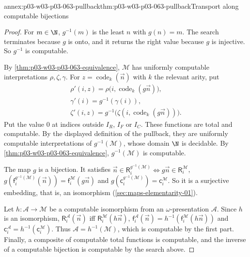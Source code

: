 \begin{annexitem}{annex:p03-w03-p03-063-pullback}{thm:p03-w03-p03-063-pullback}{Transport along computable bijections}
\begin{proof}
For \(m\in\N\), \(g^{-1}(m)\) is the least \(n\) with \(g(n)=m\).  The search
terminates because \(g\) is onto, and it returns the right value because
\(g\) is injective.  So \(g^{-1}\) is computable.

By \cref{thm:p03-w03-p03-063-equivalence}, \(\mathcal M\) has uniformly
computable interpretations \(\rho,\zeta,\gamma\).  For
\(z=\operatorname{code}_k(\vec n)\) with \(k\) the relevant arity, put
\begin{gather*}
 \rho'(i,z)=\rho\bigl(i,\operatorname{code}_k(g\vec n)\bigr),\\
 \gamma'(i)=g^{-1}(\gamma(i)),\\
 \zeta'(i,z)=g^{-1}\bigl(\zeta(i,\operatorname{code}_k(g\vec n))\bigr).
\end{gather*}
Put the value \(0\) at indices outside \(I_R\), \(I_F\) or \(I_C\).  These
functions are total and computable.  By the displayed definition of the
pullback, they are uniformly computable interpretations of
\(g^{-1}(\mathcal M)\), whose domain \(\N\) is decidable.  By
\cref{thm:p03-w03-p03-063-equivalence}, \(g^{-1}(\mathcal M)\) is computable.

The map \(g\) is a bijection.  It satisfies
\(\vec n\in\mathsf R_i^{g^{-1}(\mathcal M)}\iff g\vec n\in\mathsf R_i^{\mathcal M}\),
\(g(\mathsf f_i^{g^{-1}(\mathcal M)}(\vec n))=\mathsf f_i^{\mathcal M}(g\vec n)\)
and \(g(\mathsf c_i^{g^{-1}(\mathcal M)})=\mathsf c_i^{\mathcal M}\).
So it is a surjective embedding, that is, an isomorphism
(\cref{sec:maps-elementarity-01}).

Let \(h:\mathcal A\to\mathcal M\) be a computable isomorphism from an
\(\omega\)-presentation \(\mathcal A\).  Since \(h\) is an isomorphism,
\(\mathsf R_i^{\mathcal A}(\vec n)\) iff \(\mathsf R_i^{\mathcal M}(h\vec n)\),
\(\mathsf f_i^{\mathcal A}(\vec n)=h^{-1}(\mathsf f_i^{\mathcal M}(h\vec n))\)
and \(\mathsf c_i^{\mathcal A}=h^{-1}(\mathsf c_i^{\mathcal M})\).  Thus
\(\mathcal A=h^{-1}(\mathcal M)\), which is computable by the first part.
Finally, a composite of computable total functions is computable, and the
inverse of a computable bijection is computable by the search above.
\end{proof}
\end{annexitem}

